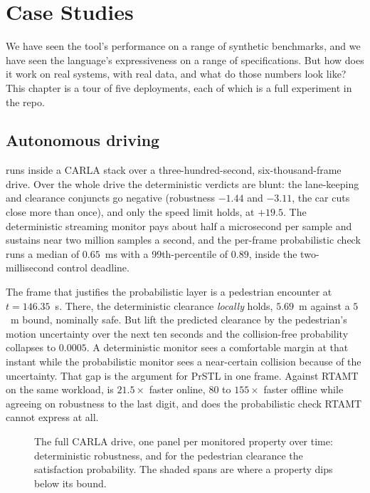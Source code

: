 \chapter{Case Studies}
\label{ch:cases}

We have seen the tool's performance on a range of synthetic benchmarks, and we have seen the language's expressiveness on a range of specifications. But how does it work on real systems, with real data, and what do those numbers look like? This chapter is a tour of five deployments, each of which is a full experiment in the repo.

\section{Autonomous driving}

\sentil{} runs inside a CARLA stack over a three-hundred-second, six-thousand-frame drive. Over the whole drive the deterministic verdicts are blunt: the lane-keeping and clearance conjuncts go negative (robustness $-1.44$ and $-3.11$, the car cuts close more than once), and only the speed limit holds, at $+19.5$. The deterministic streaming monitor pays about half a microsecond per sample and sustains near two million samples a second, and the per-frame probabilistic check runs a median of $0.65$~ms with a 99th-percentile of $0.89$, inside the two-millisecond control deadline.

The frame that justifies the probabilistic layer is a pedestrian encounter at $t = 146.35$~s. There, the deterministic clearance \emph{locally} holds, $5.69$~m against a $5$~m bound, nominally safe. But lift the predicted clearance by the pedestrian's motion uncertainty over the next ten seconds and the collision-free probability collapses to $0.0005$. A deterministic monitor sees a comfortable margin at that instant while the probabilistic monitor sees a near-certain collision because of the uncertainty. That gap is the argument for PrSTL in one frame. Against RTAMT on the same workload, \sentil{} is $21.5\times$ faster online, $80$ to $155\times$ faster offline while agreeing on robustness to the last digit, and does the probabilistic check RTAMT cannot express at all.

\begin{figure}[h]
\centering
{}
\caption{The full CARLA drive, one panel per monitored property over time: deterministic robustness, and for the pedestrian clearance the satisfaction probability. The shaded spans are where a property dips below its bound.}
\label{fig:carla-timeline}
\end{figure}

